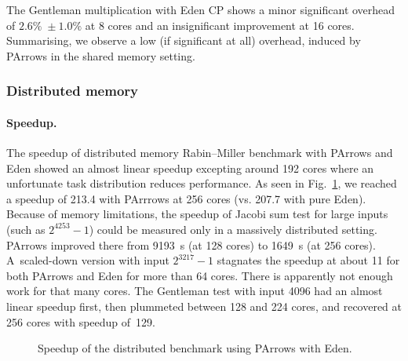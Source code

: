 \documentclass{jfp1}
\begin{document}
The Gentleman multiplication with Eden CP shows a minor significant overhead of $2.6\% \; \pm 1.0\%$ at 8 cores and an insignificant improvement at 16 cores. Summarising, we observe a low (if significant at all) overhead, induced by PArrows in the shared memory setting.

\subsubsection{Distributed memory}

\paragraph{Speedup.}
The speedup of distributed memory Rabin--Miller benchmark with PArrows and Eden showed an almost 
linear speedup excepting around 192 cores where an unfortunate task distribution reduces performance.
As seen in Fig.~\ref{fig:rabinMillerDistSpeedup}, we reached a speedup of 213.4 with PArrrows at 256 cores (vs. 207.7 with pure Eden). Because of memory limitations, the speedup of Jacobi sum test for large inputs (such as $2^{4253}-1$) could be measured only in a massively distributed setting. PArrows improved there from \SI{9193}{\second} (at 128 cores) to \SI{1649}{\second} (at 256 cores). A~scaled-down version with input $2^{3217}-1$ stagnates the speedup at about 11 for both PArrows and Eden for more than 64 cores. There is apparently not enough work for that many cores. The Gentleman test with input 4096 had an almost linear speedup first, then plummeted between 128 and 224 cores, and recovered at 256 cores with speedup of~129.

\begin{figure}[ht]
	\centering
	\caption[Speedup distributed Rabin--Miller]{Speedup of the distributed \rmtest benchmark using PArrows with Eden.}
	\label{fig:rabinMillerDistSpeedup}
\end{figure}
\end{document}
